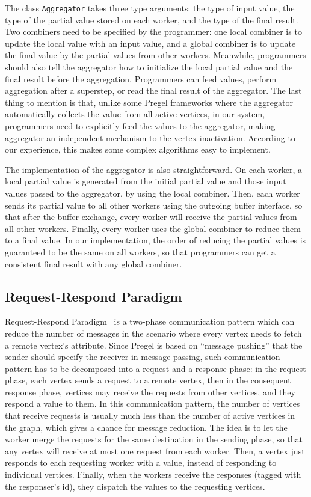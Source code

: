 \documentclass{sokendai_thesis} %
\begin{document}
The class \texttt{Aggregator} takes three type arguments: the type of input value, the type of the partial value stored on each worker, and the type of the final result.
Two combiners need to be specified by the programmer: one local combiner is to update the local value with an input value, and a global combiner is to update the final value by the partial values from other workers.
Meanwhile, programmers should also tell the aggregator how to initialize the local partial value and the final result before the aggregation.
Programmers can feed values, perform aggregation after a superstep, or read the final result of the aggregator.
The last thing to mention is that, unlike some Pregel frameworks where the aggregator automatically collects the value from all active vertices, in our system, programmers need to explicitly feed the values to the aggregator, making aggregator an independent mechanism to the vertex inactivation.
According to our experience, this makes some complex algorithms easy to implement.

The implementation of the aggregator is also straightforward.
On each worker, a local partial value is generated from the initial partial value and those input values passed to the aggregator, by using the local combiner.
Then, each worker sends its partial value to all other workers using the outgoing buffer interface, so that after the buffer exchange, every worker will receive the partial values from all other workers.
Finally, every worker uses the global combiner to reduce them to a final value.
In our implementation, the order of reducing the partial values is guaranteed to be the same on all workers, so that programmers can get a consistent final result with any global combiner.

\subsection{Request-Respond Paradigm}

Request-Respond Paradigm~\cite{pregelplus} is a two-phase communication pattern which can reduce the number of messages in the scenario where every vertex needs to fetch a remote vertex's attribute.
Since Pregel is based on ``message pushing'' that the sender should specify the receiver in message passing, such communication pattern has to be decomposed into a request and a response phase:
in the request phase, each vertex sends a request to a remote vertex, then in the consequent response phase, vertices may receive the requests from other vertices, and they respond a value to them.
In this communication pattern, the number of vertices that receive requests is usually much less than the number of active vertices in the graph, which gives a chance for message reduction.
The idea is to let the worker merge the requests for the same destination in the sending phase, so that any vertex will receive at most one request from each worker.
Then, a vertex just responds to each requesting worker with a value, instead of responding to individual vertices.
Finally, when the workers receive the responses (tagged with the responser's id), they dispatch the values to the requesting vertices.
\end{document}
